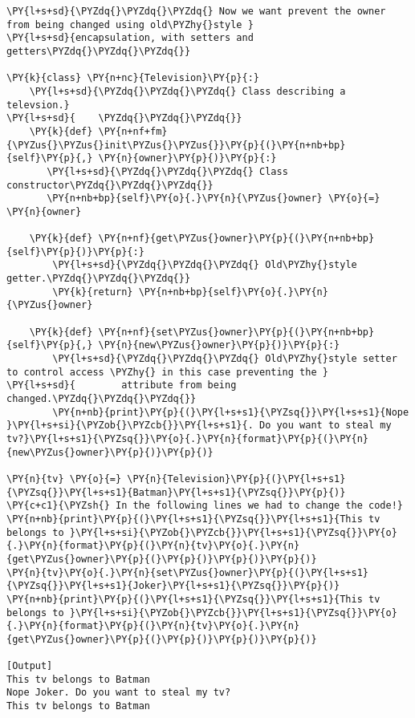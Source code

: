 \begin{Verbatim}[label=\makebox{\url{https://github.com/lucabaldini/cmepda/tree/master/slides/latex/snippets/class\_tv\_encapsulation\_old.py}},commandchars=\\\{\}]
\PY{l+s+sd}{\PYZdq{}\PYZdq{}\PYZdq{} Now we want prevent the owner from being changed using old\PYZhy{}style }
\PY{l+s+sd}{encapsulation, with setters and getters\PYZdq{}\PYZdq{}\PYZdq{}}

\PY{k}{class} \PY{n+nc}{Television}\PY{p}{:}
    \PY{l+s+sd}{\PYZdq{}\PYZdq{}\PYZdq{} Class describing a televsion.}
\PY{l+s+sd}{    \PYZdq{}\PYZdq{}\PYZdq{}}
    \PY{k}{def} \PY{n+nf+fm}{\PYZus{}\PYZus{}init\PYZus{}\PYZus{}}\PY{p}{(}\PY{n+nb+bp}{self}\PY{p}{,} \PY{n}{owner}\PY{p}{)}\PY{p}{:}
       \PY{l+s+sd}{\PYZdq{}\PYZdq{}\PYZdq{} Class constructor\PYZdq{}\PYZdq{}\PYZdq{}}
       \PY{n+nb+bp}{self}\PY{o}{.}\PY{n}{\PYZus{}owner} \PY{o}{=} \PY{n}{owner}
    
    \PY{k}{def} \PY{n+nf}{get\PYZus{}owner}\PY{p}{(}\PY{n+nb+bp}{self}\PY{p}{)}\PY{p}{:}
        \PY{l+s+sd}{\PYZdq{}\PYZdq{}\PYZdq{} Old\PYZhy{}style getter.\PYZdq{}\PYZdq{}\PYZdq{}}
        \PY{k}{return} \PY{n+nb+bp}{self}\PY{o}{.}\PY{n}{\PYZus{}owner}
        
    \PY{k}{def} \PY{n+nf}{set\PYZus{}owner}\PY{p}{(}\PY{n+nb+bp}{self}\PY{p}{,} \PY{n}{new\PYZus{}owner}\PY{p}{)}\PY{p}{:}
        \PY{l+s+sd}{\PYZdq{}\PYZdq{}\PYZdq{} Old\PYZhy{}style setter to control access \PYZhy{} in this case preventing the }
\PY{l+s+sd}{        attribute from being changed.\PYZdq{}\PYZdq{}\PYZdq{}}
        \PY{n+nb}{print}\PY{p}{(}\PY{l+s+s1}{\PYZsq{}}\PY{l+s+s1}{Nope }\PY{l+s+si}{\PYZob{}\PYZcb{}}\PY{l+s+s1}{. Do you want to steal my tv?}\PY{l+s+s1}{\PYZsq{}}\PY{o}{.}\PY{n}{format}\PY{p}{(}\PY{n}{new\PYZus{}owner}\PY{p}{)}\PY{p}{)}
    
\PY{n}{tv} \PY{o}{=} \PY{n}{Television}\PY{p}{(}\PY{l+s+s1}{\PYZsq{}}\PY{l+s+s1}{Batman}\PY{l+s+s1}{\PYZsq{}}\PY{p}{)}
\PY{c+c1}{\PYZsh{} In the following lines we had to change the code!}
\PY{n+nb}{print}\PY{p}{(}\PY{l+s+s1}{\PYZsq{}}\PY{l+s+s1}{This tv belongs to }\PY{l+s+si}{\PYZob{}\PYZcb{}}\PY{l+s+s1}{\PYZsq{}}\PY{o}{.}\PY{n}{format}\PY{p}{(}\PY{n}{tv}\PY{o}{.}\PY{n}{get\PYZus{}owner}\PY{p}{(}\PY{p}{)}\PY{p}{)}\PY{p}{)}
\PY{n}{tv}\PY{o}{.}\PY{n}{set\PYZus{}owner}\PY{p}{(}\PY{l+s+s1}{\PYZsq{}}\PY{l+s+s1}{Joker}\PY{l+s+s1}{\PYZsq{}}\PY{p}{)}
\PY{n+nb}{print}\PY{p}{(}\PY{l+s+s1}{\PYZsq{}}\PY{l+s+s1}{This tv belongs to }\PY{l+s+si}{\PYZob{}\PYZcb{}}\PY{l+s+s1}{\PYZsq{}}\PY{o}{.}\PY{n}{format}\PY{p}{(}\PY{n}{tv}\PY{o}{.}\PY{n}{get\PYZus{}owner}\PY{p}{(}\PY{p}{)}\PY{p}{)}\PY{p}{)}

[Output]
This tv belongs to Batman
Nope Joker. Do you want to steal my tv?
This tv belongs to Batman
\end{Verbatim}